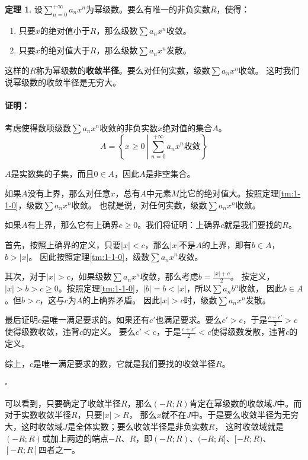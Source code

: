 \documentclass[12pt,UTF8]{ctexbook}
\theoremstyle{definition}
\newtheorem{tm}{定理}[section]
\theoremstyle{plain}
\renewenvironment{proof}{\paragraph{\textbf{证明：}}}{\hfill$\square$}
\begin{document}
\begin{tm}\label{tm:1-1-10}
    设$\displaystyle\sum_{n=0}^{+\infty} a_n x^n$为幂级数。要么有唯一的非负实数$R$，使得：
    \begin{enumerate}
        \item 只要$x$的绝对值小于$R$，那么级数$\sum a_n x^n$收敛。
        \item 只要$x$的绝对值大于$R$，那么级数$\sum a_n x^n$发散。
    \end{enumerate}
    这样的$R$称为幂级数的\textbf{收敛半径}。要么对任何实数，级数$\sum a_n x^n$收敛。
    这时我们说幂级数的收敛半径是无穷大。
\end{tm}

\begin{proof}
    考虑使得数项级数$\sum a_n x^n$收敛的非负实数$x$绝对值的集合$A$。
    $$A = \left\{ x \geqslant 0 \, \left| \, \sum_{n=0}^{+\infty} a_n x^n \mbox{收敛} \right. \right\} $$

    $A$是实数集的子集，而且$0\in A$，因此$A$是非空集合。

    如果$A$没有上界，那么对任意$x$，总有$A$中元素$M$比它的绝对值大。按照定理\ref{tm:1-1-0}，级数$\sum a_n x^n$收敛。
    也就是说，对任何实数，级数$\sum a_n x^n$收敛。

    如果$A$有上界，那么它有上确界$c\geqslant 0$。我们将证明：上确界$c$就是我们要找的$R$。
    
    首先，按照上确界的定义，只要$|x|<c$，那么$|x|$不是$A$的上界，即有$b\in A$，$b>|x|$。
    因此按照定理\ref{tm:1-1-0}，级数$\sum a_n x^n$收敛。

    其次，对于$|x|>c$，如果级数$\sum a_n x^n$收敛，那么考虑$b = \frac{|x| + c}{2}$。
    按定义，$|x| > b > c \geqslant 0$。按照定理\ref{tm:1-1-0}，$|b| = b < |x|$，所以$\sum a_n b^n$收敛，
    因此$b \in A$。但$b>c$，这与$c$为$A$的上确界矛盾。
    因此$|x|>c$时，级数$\sum a_n x^n$发散。

    最后证明$c$是唯一满足要求的。如果还有$c'$也满足要求。要么$c'>c$，于是$\frac{c+c'}{2} > c$使得级数收敛，违背$c$的定义。
    要么$c'<c$，于是$\frac{c+c'}{2} < c$使得级数发散，违背$c$的定义。

    综上，$c$是唯一满足要求的数，它就是我们要找的收敛半径$R$。

\end{proof}

可以看到，只要确定了收敛半径$R$，那么$(-R;R)$肯定在幂级数的收敛域$J$中。而对于实数收敛半径$R$，只要$|x|>R$，
那么$x$就不在$J$中。于是要么收敛半径为无穷大，这时收敛域$J$是全体实数；要么收敛半径是非负实数$R$，
这时收敛域就是$(-R;R)$或加上两边的端点$-R$、$R$，即$(-R;R)$、$(-R;R]$、$[-R;R)$、$[-R;R]$四者之一。
\end{document}
